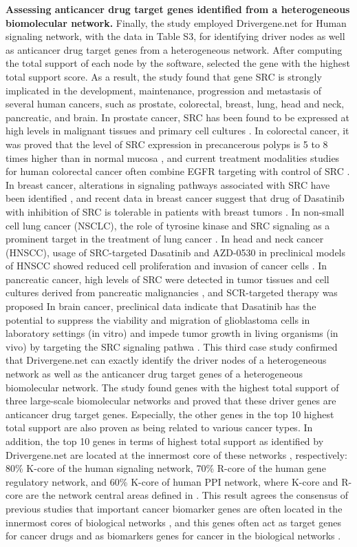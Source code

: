 \documentclass[5p,,preprint,12pt]{elsarticle}
\begin{document}
\textbf{Assessing anticancer drug target genes identified from a heterogeneous biomolecular network.} Finally, the study employed Drivergene.net for Human signaling network, with the data in Table S3, for identifying driver nodes as well as anticancer drug target genes from a heterogeneous network. After computing the total support of each node by the software,  selected the gene with the highest total support score. As a result, the study found that gene SRC is strongly implicated in the development, maintenance, progression and metastasis of several human cancers, such as prostate, colorectal, breast, lung, head and neck, pancreatic, and brain. In prostate cancer, SRC has been found to be expressed at high levels in malignant tissues and primary cell cultures \cite{53,54}. In colorectal cancer, it was proved that the level of SRC expression in precancerous polyps is 5 to 8 times higher than in normal mucosa \cite{54}, and current treatment modalities studies for human colorectal cancer often combine EGFR targeting with control of SRC \cite{56,57}. In breast cancer, alterations in signaling pathways associated with SRC have been identified \cite{58}, and recent data in breast cancer suggest that drug of Dasatinib with inhibition of SRC is tolerable in patients with breast tumors \cite{59}. In non-small cell lung cancer (NSCLC), the role of tyrosine kinase and SRC signaling as a prominent target in the treatment of lung cancer \cite{60,61}. In head and neck cancer (HNSCC), usage of SRC-targeted Dasatinib and AZD-0530 in preclinical models of HNSCC showed reduced cell proliferation and invasion of cancer cells \cite{62,63}. In pancreatic cancer, high levels of SRC were detected in tumor tissues and cell cultures derived from pancreatic malignancies \cite{64,65}, and SCR-targeted therapy was proposed In brain cancer, preclinical data indicate that Dasatinib has the potential to suppress the viability and migration of glioblastoma cells in laboratory settings (in vitro) and impede tumor growth in living organisms (in vivo) by targeting the SRC signaling pathwa \cite{66}.  This third case study confirmed that Drivergene.net can exactly identify the driver nodes of a heterogeneous network as well as the anticancer drug target genes of a heterogeneous biomolecular network. The study found genes with the highest total support of three large-scale biomolecular networks and proved that these driver genes are anticancer drug target genes. Especially, the other genes in the top 10 highest total support are also proven as being related to various cancer types. In addition, the top 10 genes in terms of highest total support as identified by Drivergene.net are located at the innermost core of these networks \cite{24}, respectively: 80\% K-core of the human signaling network, 70\% R-core of the human gene regulatory network, and 60\% K-core of human PPI network, where K-core and R-core are the network central areas defined in \cite{34}. This result agrees the consensus of previous studies that important cancer biomarker genes are often located in the innermost cores of biological networks \cite{31,32,33,34}, and this genes often act as target genes for cancer drugs and as biomarkers genes for cancer in the biological networks \cite{23}.
\end{document}
